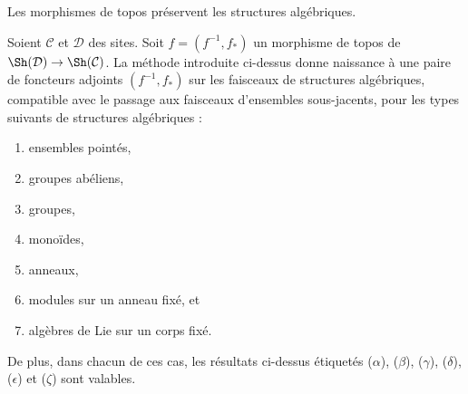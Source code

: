 \begin{proposition}
\label{proposition-functoriality-algebraic-structures-topoi}
\begin{slogan}
Les morphismes de topos préservent les structures algébriques.
\end{slogan}
Soient $\mathcal{C}$ et $\mathcal{D}$ des sites.
Soit $f = (f^{-1}, f_*)$ un morphisme de topos
de $\Sh(\mathcal{D}) \to \Sh(\mathcal{C})$.
La méthode introduite ci-dessus donne naissance à une
paire de foncteurs adjoints $(f^{-1}, f_*)$ sur les faisceaux de structures algébriques,
compatible avec le passage aux faisceaux d'ensembles sous-jacents,
pour les types suivants de structures algébriques :
\begin{enumerate}
\item ensembles pointés,
\item groupes abéliens,
\item groupes,
\item monoïdes,
\item anneaux,
\item modules sur un anneau fixé, et
\item algèbres de Lie sur un corps fixé.
\end{enumerate}
De plus, dans chacun de ces cas, les résultats ci-dessus étiquetés ($\alpha$),
($\beta$), ($\gamma$), ($\delta$), ($\epsilon$) et ($\zeta$) sont valables.
\end{proposition}


